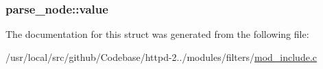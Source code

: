 \subsubsection[{\texorpdfstring{value}{value}}]{ parse\+\_\+node\+::value}\hypertarget{structparse__node_a3338c5402643aa9575af67972f8a632f}{}\label{structparse__node_a3338c5402643aa9575af67972f8a632f}


The documentation for this struct was generated from the following file\+:\begin{DoxyCompactItemize}
\item 
/usr/local/src/github/\+Codebase/httpd-\/2../modules/filters/\hyperlink{mod__include_8c}{mod\+\_\+include.\+c}\end{DoxyCompactItemize}
